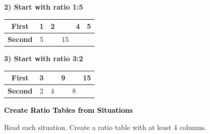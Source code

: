 \documentclass[12pt, letterpaper, fleqn]{article}
\begin{document}
\vspace{3mm}

\noindent
\textbf{2) Start with ratio 1:5}

\begin{center}
\begin{tabular}{|c|c|c|c|c|c|}
\hline
\textbf{First} & 1 & 2 & \phantom{00} & 4 & 5 \\
\hline
\textbf{Second} & 5 & \phantom{00} & 15 & \phantom{00} & \phantom{00} \\
\hline
\end{tabular}
\end{center}

\vspace{3mm}

\noindent
\textbf{3) Start with ratio 3:2}

\begin{center}
\begin{tabular}{|c|c|c|c|c|c|}
\hline
\textbf{First} & 3 & \phantom{00} & 9 & \phantom{00} & 15 \\
\hline
\textbf{Second} & 2 & 4 & \phantom{00} & 8 & \phantom{00} \\
\hline
\end{tabular}
\end{center}

\newpage

\begin{tcolorbox}[colback=customteal!20]
\large\textcolor{black}{\textbf{Create Ratio Tables from Situations}}
\end{tcolorbox}

\noindent
Read each situation. Create a ratio table with at least 4 columns.

\vspace{3mm}
\end{document}
